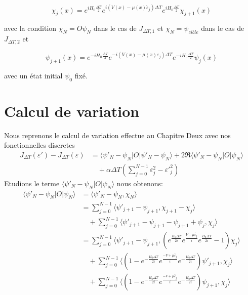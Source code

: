 \begin{equation}
\chi_j(x) = e^{iH_0\frac{\Delta T}{2}} e^{i(V(x)-\mu(x)\tilde{\varepsilon}_j)\Delta T} e^{iH_0\frac{\Delta T}{2}} \chi_{j+1}(x)
\end{equation}

avec la condition $\chi_N = O\psi_N$ dans le cas de $J_{\Delta T,1}$ et $\chi_N = \psi_{cible}$ dans le cas de $J_{\Delta T,2}$ et

\begin{equation}
\psi_{j+1}(x) = e^{-iH_0\frac{\Delta T}{2}} e^{-i(V(x)-\mu(x)\varepsilon_j)\Delta T} e^{-iH_0\frac{\Delta T}{2}} \psi_j(x)
\end{equation}

avec un état initial $\psi_0$ fixé.

\section{Calcul de variation}
Nous reprenons le calcul de variation effectue au Chapitre Deux avec nos fonctionnelles discretes
\begin{align*}
J_{\Delta T}(\varepsilon')-J_{\Delta T}(\varepsilon) &= \langle \psi'_N-\psi_N |O|\psi'_N-\psi_N \rangle + 2\Re \langle \psi'_N-\psi_N |O|\psi_N \rangle\\
&\quad +\alpha \Delta T (\sum_{j=0}^{N -1} \varepsilon_j^2-{\varepsilon'}_j^{2})
\end{align*}
Etudions le terme $\langle \psi'_N-\psi_N |O|\psi_N \rangle$ nous obtenons:
\begin{align*}
\langle \psi'_N-\psi_N |O|\psi_N \rangle &= \langle \psi'_N-\psi_N , \chi_N \rangle\\
&=\sum_{j=0}^{N-1} \langle \psi'_{j+1}-\psi_{j+1} , \chi_{j+1}-\chi_{j} \rangle\\
&\quad + \sum_{j=0}^{N-1} \langle \psi'_{j+1}-\psi_{j+1}-\psi_{j+1}+\psi_{j}, \chi_{j} \rangle\\
&=\sum_{j=0}^{N-1} \langle \psi'_{j+1}-\psi_{j+1} , (e^{\frac{H_0\Delta T}{2i}} e^{\frac{V-\mu\tilde{\varepsilon_j}}{i}} e^{\frac{H_0\Delta T}{2i}}-1)\chi_{j} \rangle\\
&\quad + \sum_{j=0}^{N-1} \langle (1-e^{-\frac{H_0\Delta T}{2i}} e^{\frac{-V+\mu\tilde{\varepsilon_j}}{i}} e^{-\frac{H_0\Delta T}{2i}}) \psi'_{j+1}, \chi_{j} \rangle\\
&\quad + \sum_{j=0}^{N-1} \langle (1-e^{-\frac{H_0\Delta T}{2i}} e^{\frac{-V+\mu\tilde{\varepsilon_j}}{i}} e^{-\frac{H_0\Delta T}{2i}}) \psi_{j+1}, \chi_{j} \rangle\\
\end{align*}

